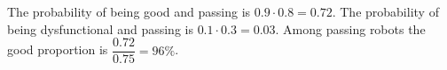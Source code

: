 The probability of being good and passing is $0.9\cdot0.8=0.72$. The probability of being dysfunctional and passing is $0.1\cdot0.3=0.03$. Among passing robots the good proportion is $\dfrac{0.72}{0.75}=\boxed{96\%}$.
